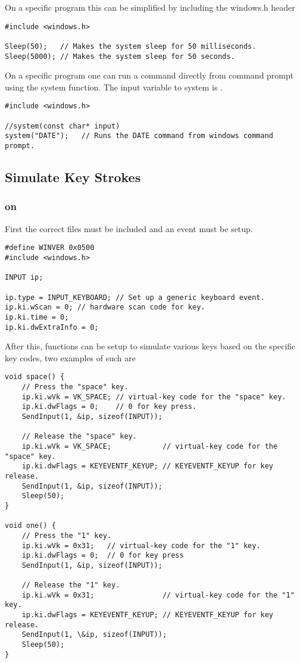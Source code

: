 On a  specific program this can be simplified by including the windows.h header
\begin{lstlisting}
#include <windows.h>

Sleep(50);   // Makes the system sleep for 50 milliseconds.
Sleep(5000); // Makes the system sleep for 50 seconds.
\end{lstlisting}


On a  specific program one can run a command directly from command prompt using the system function. The input variable to system is .
\begin{lstlisting}
#include <windows.h>

//system(const char* input)
system("DATE");   // Runs the DATE command from windows command prompt.
\end{lstlisting}










\subsection{Simulate Key Strokes}

\subsubsection{ on }

First the correct files must be included and an event must be setup.
\begin{lstlisting}
#define WINVER 0x0500
#include <windows.h> 

INPUT ip;

ip.type = INPUT_KEYBOARD; // Set up a generic keyboard event.
ip.ki.wScan = 0; // hardware scan code for key.
ip.ki.time = 0;
ip.ki.dwExtraInfo = 0;
\end{lstlisting}

After this, functions can be setup to simulate various keys based on the specific key codes, two examples of such are
\begin{lstlisting}
void space() { 
	// Press the "space" key.
	ip.ki.wVk = VK_SPACE; // virtual-key code for the "space" key.
	ip.ki.dwFlags = 0;    // 0 for key press.
	SendInput(1, &ip, sizeof(INPUT));
	
	// Release the "space" key.
	ip.ki.wVk = VK_SPACE;            // virtual-key code for the "space" key.
	ip.ki.dwFlags = KEYEVENTF_KEYUP; // KEYEVENTF_KEYUP for key release.
	SendInput(1, &ip, sizeof(INPUT));
	Sleep(50);
}

void one() { 
	// Press the "1" key.
	ip.ki.wVk = 0x31;   // virtual-key code for the "1" key.                                          
	ip.ki.dwFlags = 0;  // 0 for key press
	SendInput(1, &ip, sizeof(INPUT));
	
	// Release the "1" key.
	ip.ki.wVk = 0x31;                // virtual-key code for the "1" key.
	ip.ki.dwFlags = KEYEVENTF_KEYUP; // KEYEVENTF_KEYUP for key release.
	SendInput(1, \&ip, sizeof(INPUT));
	Sleep(50);
}
\end{lstlisting}

